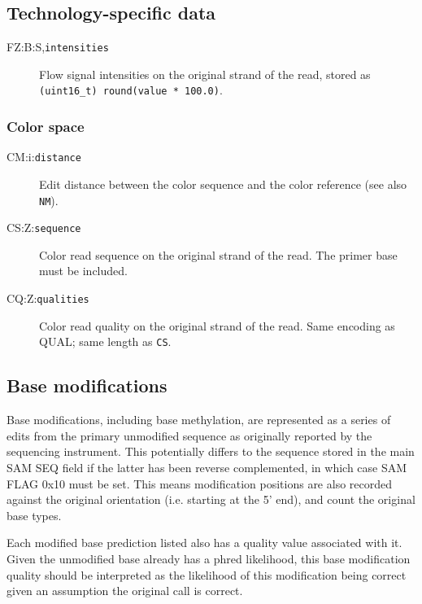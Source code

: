 \documentclass[10pt]{article}
\newcommand{\tagvalue}[1]{{\tt #1}}
\begin{document}
\subsection{Technology-specific data}

\begin{description}
\item[FZ:B:S,\tagvalue{intensities}]
Flow signal intensities on the original strand of the read, stored as {\tt (uint16\_t) round(value * 100.0)}.
\end{description}

\subsubsection{Color space}


\begin{description}
\item[CM:i:\tagvalue{distance}]
Edit distance between the color sequence and the color reference (see also {\tt NM}).

\item[CS:Z:\tagvalue{sequence}]
Color read sequence on the original strand of the read. The primer base must be included.

\item[CQ:Z:\tagvalue{qualities}]
Color read quality on the original strand of the read. Same encoding as {\sf QUAL}; same length as {\tt CS}.
\end{description}

\subsection{Base modifications}

Base modifications, including base methylation, are represented as a series of edits from the primary unmodified sequence as originally reported by the sequencing instrument.
This potentially differs to the sequence stored in the main SAM {\sf SEQ} field if the latter has been reverse complemented, in which case SAM {\sf FLAG} 0x10 must be set.
This means modification positions are also recorded against the original orientation (i.e. starting at the 5' end), and count the original base types.

Each modified base prediction listed also has a quality value associated with it.
Given the unmodified base already has a phred likelihood, this base modification quality should be interpreted as the likelihood of this modification being correct given an assumption the original call is correct.
\end{document}
